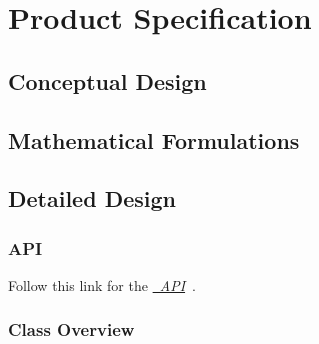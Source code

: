 \chapter{Product Specification}\label{ch:spec}

\section{Conceptual Design}



\section{Mathematical Formulations}


\section{Detailed Design}\label{sec:detailed_design}
\subsection{API}
Follow this link for the 
\href{file:refman.pdf}{\em \ModelDesc\ API}~\cite{api:mass}.

\subsection{Class Overview}

